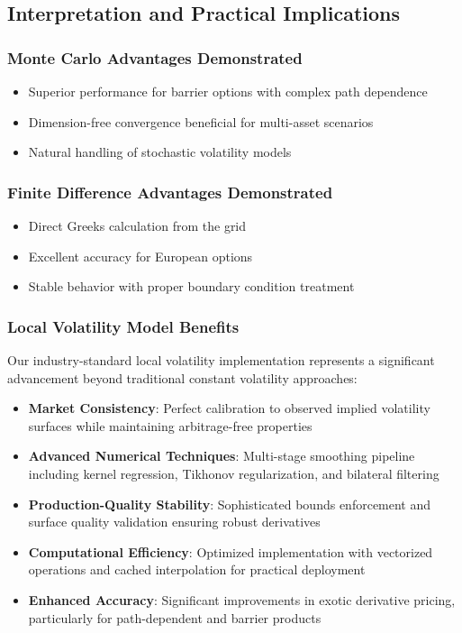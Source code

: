 \documentclass[11pt,a4paper]{article}
\begin{document}
\subsection{Interpretation and Practical Implications}

\subsubsection{Monte Carlo Advantages Demonstrated}
\begin{itemize}
\item Superior performance for barrier options with complex path dependence
\item Dimension-free convergence beneficial for multi-asset scenarios
\item Natural handling of stochastic volatility models
\end{itemize}

\subsubsection{Finite Difference Advantages Demonstrated}
\begin{itemize}
\item Direct Greeks calculation from the grid
\item Excellent accuracy for European options
\item Stable behavior with proper boundary condition treatment
\end{itemize}

\subsubsection{Local Volatility Model Benefits}
Our industry-standard local volatility implementation represents a significant advancement beyond traditional constant volatility approaches:

\begin{itemize}
\item \textbf{Market Consistency}: Perfect calibration to observed implied volatility surfaces while maintaining arbitrage-free properties
\item \textbf{Advanced Numerical Techniques}: Multi-stage smoothing pipeline including kernel regression, Tikhonov regularization, and bilateral filtering
\item \textbf{Production-Quality Stability}: Sophisticated bounds enforcement and surface quality validation ensuring robust derivatives
\item \textbf{Computational Efficiency}: Optimized implementation with vectorized operations and cached interpolation for practical deployment
\item \textbf{Enhanced Accuracy}: Significant improvements in exotic derivative pricing, particularly for path-dependent and barrier products
\end{itemize}
\end{document}
